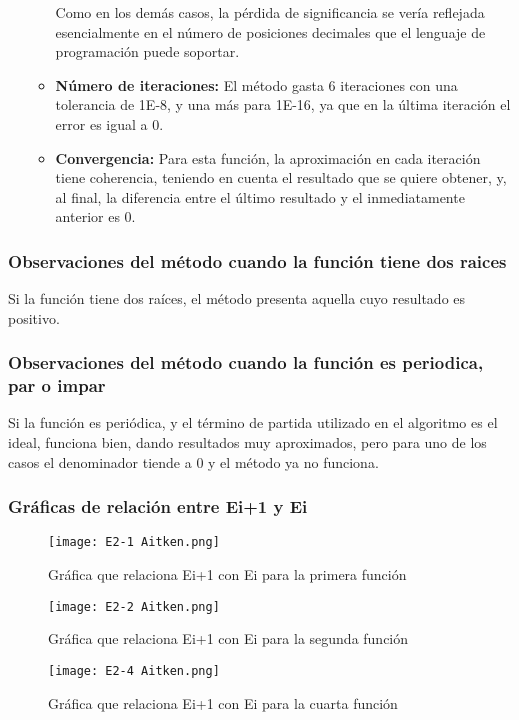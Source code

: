 \documentclass{article}
\begin{document}
\begin{enumerate}
\begin{itemize}
        Como en los demás casos, la pérdida de significancia se vería reflejada esencialmente en el número de posiciones decimales que el lenguaje de programación puede soportar.
        \item \textbf{Número de iteraciones:}
        El método gasta 6 iteraciones con una tolerancia de 1E-8, y una más para 1E-16, ya que en la última iteración el error es igual a 0.
        \item \textbf{Convergencia:}
        Para esta función, la aproximación en cada iteración tiene  coherencia, teniendo en cuenta el resultado que se quiere obtener, y, al final, la diferencia entre el último resultado y el inmediatamente anterior es 0.
    \end{itemize}
\end{enumerate}
\subsubsection{Observaciones del método cuando la función tiene dos raices}
Si  la función tiene dos raíces, el método presenta aquella cuyo resultado es positivo.
\subsubsection{Observaciones del método cuando la función es periodica, par o impar}
Si la función es periódica, y el término de partida utilizado en el algoritmo es el ideal, funciona bien, dando resultados muy aproximados, pero para uno de los casos el denominador tiende a 0 y el método ya no funciona.

\subsubsection{Gráficas de relación entre Ei+1 y Ei}

\begin{figure}[H]
    \centering
    \texttt{[image: E2-1 Aitken.png]}
    \caption{Gráfica que relaciona Ei+1 con Ei para la primera función}
    \label{fig:E2-1 Aitken}
\end{figure}

\begin{figure}[H]
    \centering
    \texttt{[image: E2-2 Aitken.png]}
    \caption{Gráfica que relaciona Ei+1 con Ei para la segunda función}
    \label{fig:E2-2 Aitken}
\end{figure}

\begin{figure}[H]
    \centering
    \texttt{[image: E2-4 Aitken.png]}
    \caption{Gráfica que relaciona Ei+1 con Ei para la cuarta función}
    \label{fig:E2-4 Aitken}
\end{figure}
\end{document}
